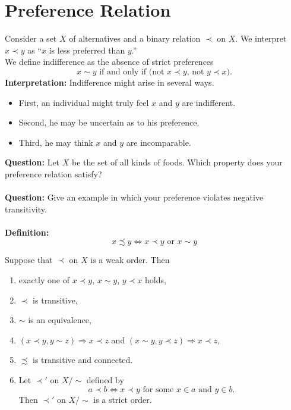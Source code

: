\documentclass[10pt,a4paper,oneside]{article}
\begin{document}
\section{Preference Relation} 
\hspace{6pt} Consider a set $X$ of alternatives and a binary relation $\prec$ on $X$. We interpret $x \prec y$ as ``$x$ is less preferred than $y$.''\\
We define indifference as the absence of strict preferences
	\begin{equation*}
	x \sim y \text{ if and only if (not } x \prec y\text{, not } y \prec x).
	\end{equation*}
{\bf Interpretation:} Indifference might arise in several ways.
\begin{itemize}
	\item First, an individual might truly feel $x$ and $y$ are indifferent.
	\item Second, he may be uncertain as to his preference.
	\item Third, he may think $x$ and $y$ are incomparable.
\end{itemize}
{\bf Question:} Let $X$ be the set of all kinds of foods. Which property does your preference relation satisfy?\\ \\
{\bf Question:} Give an example in which your preference violates negative transitivity. \\ \\
{\bf Definition:} 
	$$x \precsim y \Leftrightarrow x \prec y \text{ or } x \sim y $$
\begin{Thm} Suppose that $\prec$ on $X$ is a weak order. Then
	\begin{enumerate}[label=\arabic*.]
		\item exactly one of $x\prec y$, $x \sim y$, $y \prec x$ holds,
		\item $\prec$ is transitive,
		\item $\sim$ is an equivalence,
		\item $(x\prec y, y \sim z ) \Rightarrow x \prec z$ and $(x \sim y, y \prec z ) \Rightarrow x \prec z$,
		\item $\precsim$ is transitive and connected.
		\item Let $\prec'$ on $X/\sim$ defined by $$a \prec b \Leftrightarrow x \prec y \text{ for some } x\in a \text{ and }y \in b.$$ Then $\prec'$ on $X/\sim$ is a strict order.
	\end{enumerate}
\end{Thm}
\end{document}
